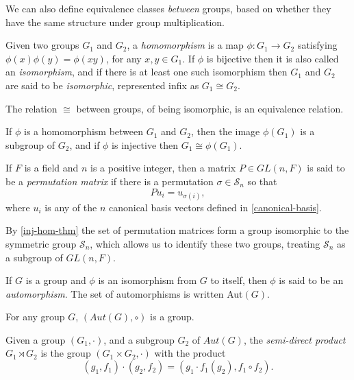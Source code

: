 We can also define equivalence classes \emph{between} groups, based on whether they have the same structure under group multiplication.
\begin{define}
	Given two groups $G_1$ and $G_2$, a \emph{homomorphism} is a map $\phi: G_1 \to G_2$ satisfying $\phi(x)\phi(y) = \phi(xy)$, for any $x, y \in G_1$. If $\phi$ is bijective then it is also called an \emph{isomorphism}, and if there is at least one such isomorphism then $G_1$ and $G_2$ are said to be \emph{isomorphic}, represented infix as $G_1 \cong G_2$.
\end{define}

\begin{prop}
	The relation $\cong$ between groups, of being isomorphic, is an equivalence relation.
\end{prop}

\begin{prop}\label{inj-hom-thm}
	If $\phi$ is a homomorphism between $G_1$ and $G_2$, then the image $\phi(G_1)$ is a subgroup of $G_2$, and if $\phi$ is injective then $G_1 \cong \phi(G_1)$.
\end{prop}

\begin{define}
	If $F$ is a field and $n$ is a positive integer, then a matrix $P \in GL(n, F)$ is said to be a \emph{permutation matrix} if there is a permutation $\sigma \in \mathcal{S}_n$ so that
	\[Pu_i = u_{\sigma(i)},\]
	where $u_i$ is any of the $n$ canonical basis vectors defined in \autoref{canonical-basis}.
\end{define}

By \autoref{inj-hom-thm} the set of permutation matrices form a group isomorphic to the symmetric group $\mathcal{S}_n$, which allows us to identify these two groups, treating $\mathcal{S}_n$ as a subgroup of $GL(n, F)$.

\begin{define}
	If $G$ is a group and $\phi$ is an isomorphism from $G$ to itself, then $\phi$ is said to be an \emph{automorphism}. The set of automorphisms is written Aut$(G)$.
\end{define}
\begin{prop}
	For any group $G$, $(Aut(G), \circ)$ is a group.
\end{prop}
\begin{define}
	Given a group $(G_1, \cdot)$, and a subgroup $G_2$ of $Aut(G)$, the \emph{semi-direct product} $G_1 \rtimes G_2$ is the group $(G_1 \times G_2, \cdot)$ with the product
	\[(g_1, f_1)\cdot (g_2, f_2) = (g_1 \cdot f_1(g_2), f_1 \circ f_2).\]
\end{define}

